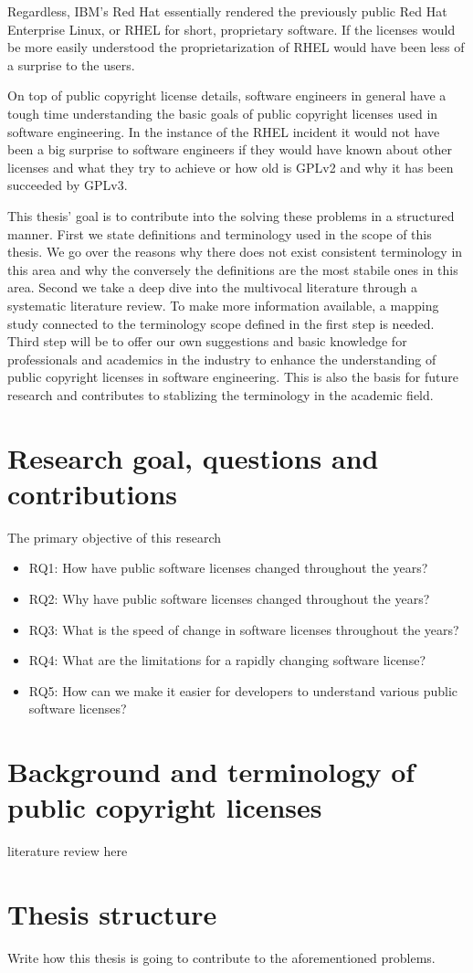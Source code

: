 Regardless, IBM's Red Hat essentially rendered the previously public Red Hat Enterprise Linux, or RHEL for short, proprietary software. If the licenses would be more easily understood the proprietarization of RHEL would have been less of a surprise to the users.

On top of public copyright license details, software engineers in general have a tough time understanding the basic goals of public copyright licenses used in software engineering. In the instance of the RHEL incident it would not have been a big surprise to software engineers if they would have known about other licenses and what they try to achieve or how old is GPLv2 and why it has been succeeded by GPLv3.

This thesis' goal is to contribute into the solving these problems in a structured manner. First we state definitions and terminology used in the scope of this thesis. We go over the reasons why there does not exist consistent terminology in this area and why the conversely the definitions are the most stabile ones in this area. Second we take a deep dive into the multivocal literature through a systematic literature review. To make more information available, a mapping study connected to the terminology scope defined in the first step is needed. Third step will be to offer our own suggestions and basic knowledge for professionals and academics in the industry to enhance the understanding of public copyright licenses in software engineering. This is also the basis for future research and contributes to stablizing the terminology in the academic field.

\section{Research goal, questions and contributions}
The primary objective of this research 
\begin{itemize}
	\item RQ1: How have public software licenses changed throughout the years?
	\item RQ2: Why have public software licenses changed throughout the years?
	\item RQ3: What is the speed of change in software licenses throughout the years?
	\item RQ4: What are the limitations for a rapidly changing software license?
	\item RQ5: How can we make it easier for developers to understand various public software licenses?
\end{itemize}

\section{Background and terminology of public copyright licenses}
literature review here

\section{Thesis structure}

Write how this thesis is going to contribute to the aforementioned problems.
